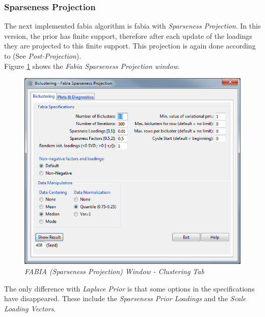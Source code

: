 \documentclass[a4paper]{article}\usepackage[]{graphicx}\usepackage[]{color}
\begin{document}
\subsubsection{Sparseness Projection}
The next implemented fabia algorithm is fabia with {\it Sparseness Projection}.
In this version, the prior has finite support, therefore after each update of the
loadings they are projected to this finite support. This projection is again
done according to \citet{Hoyer2004} (See {\it Post-Projection}).\\
Figure \ref{fabiasparseproj_clusttab} shows the {\it Fabia Sparseness Projection
window}.
\begin{figure}[H]
\centering
\includegraphics[scale=0.5]{figures/fabiasparseproj_clusttab.png}
\caption{{\it FABIA (Sparseness Projection) Window - Clustering
Tab}\label{fabiasparseproj_clusttab}}
\end{figure}
\noindent The only difference with {\it Laplace Prior} is that some options in
the specifications have disappeared. These include the {\it Sparseness Prior
Loadings} and the {\it Scale Loading Vectors}.
\end{document}

